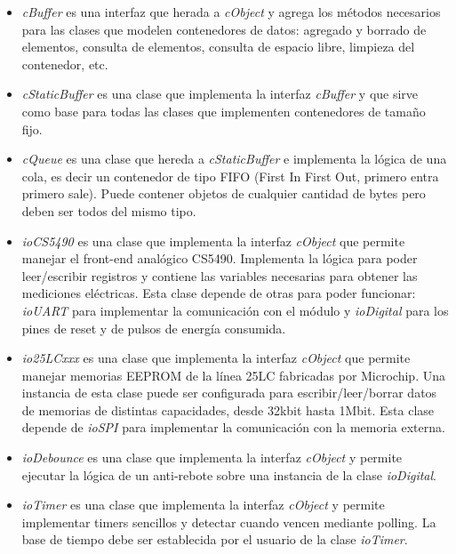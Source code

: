 \begin{itemize}
\item \textit{cBuffer} es una interfaz que herada a \textit{cObject} y agrega los métodos necesarios para las clases que modelen contenedores de datos: agregado y borrado de elementos, consulta de elementos, consulta de espacio libre, limpieza del contenedor, etc.

\item \textit{cStaticBuffer} es una clase que implementa la interfaz \textit{cBuffer} y que sirve como base para todas las clases que implementen contenedores de tamaño fijo.

\item \textit{cQueue} es una clase que hereda a \textit{cStaticBuffer} e implementa la lógica de una cola, es decir un contenedor de tipo FIFO (First In First Out, primero entra primero sale). Puede contener objetos de cualquier cantidad de bytes pero deben ser todos del mismo tipo.

\item \textit{ioCS5490} es una clase que implementa la interfaz \textit{cObject} que permite manejar el front-end analógico CS5490. Implementa la lógica para poder leer/escribir registros y contiene las variables necesarias para obtener las mediciones eléctricas. Esta clase depende de otras para poder funcionar: \textit{ioUART} para implementar la comunicación con el módulo y \textit{ioDigital} para los pines de reset y de pulsos de energía consumida.

\item \textit{io25LCxxx} es una clase que implementa la interfaz \textit{cObject} que permite manejar memorias EEPROM de la línea 25LC fabricadas por Microchip. Una instancia de esta clase puede ser configurada para escribir/leer/borrar datos de memorias de distintas capacidades, desde 32kbit  hasta 1Mbit. Esta clase depende de \textit{ioSPI} para implementar la comunicación con la memoria externa.

\item \textit{ioDebounce} es una clase que implementa la interfaz \textit{cObject} y permite ejecutar la lógica de un anti-rebote sobre una instancia de la clase \textit{ioDigital}.

\item \textit{ioTimer} es una clase que implementa la interfaz \textit{cObject} y permite implementar timers sencillos y detectar cuando vencen mediante polling. La base de tiempo debe ser establecida por el usuario de la clase \textit{ioTimer}.

\end{itemize}

